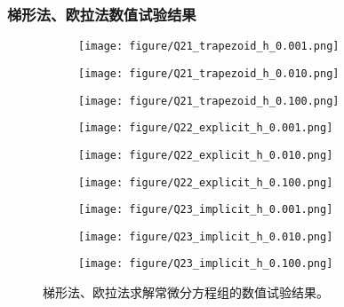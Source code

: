 \documentclass{article}
\begin{document}
\subsubsection{梯形法、欧拉法数值试验结果}
\begin{figure*}[h]
    \begin{subfigure}[h]{0.3\textwidth}
        \centering
        \texttt{[image: figure/Q21\_trapezoid\_h\_0.001.png]}
    \end{subfigure}
    \begin{subfigure}[h]{0.3\textwidth}
        \centering
        \texttt{[image: figure/Q21\_trapezoid\_h\_0.010.png]}
    \end{subfigure}
    \begin{subfigure}[h]{0.3\textwidth}
        \centering
        \texttt{[image: figure/Q21\_trapezoid\_h\_0.100.png]}
    \end{subfigure}
    
    \begin{subfigure}[h]{0.3\textwidth}
        \centering
        \texttt{[image: figure/Q22\_explicit\_h\_0.001.png]}
    \end{subfigure}
    \begin{subfigure}[h]{0.3\textwidth}
        \centering
        \texttt{[image: figure/Q22\_explicit\_h\_0.010.png]}
    \end{subfigure}
    \begin{subfigure}[h]{0.3\textwidth}
        \centering
        \texttt{[image: figure/Q22\_explicit\_h\_0.100.png]}
    \end{subfigure}
    
    \begin{subfigure}[h]{0.3\textwidth}
        \centering
        \texttt{[image: figure/Q23\_implicit\_h\_0.001.png]}
    \end{subfigure}
    \begin{subfigure}[h]{0.3\textwidth}
        \centering
        \texttt{[image: figure/Q23\_implicit\_h\_0.010.png]}
    \end{subfigure}
    \begin{subfigure}[h]{0.3\textwidth}
        \centering
        \texttt{[image: figure/Q23\_implicit\_h\_0.100.png]}
    \end{subfigure}
    \caption{梯形法、欧拉法求解常微分方程组的数值试验结果。}
    \label{fig:phase-plane}
\end{figure*}
\end{document}
